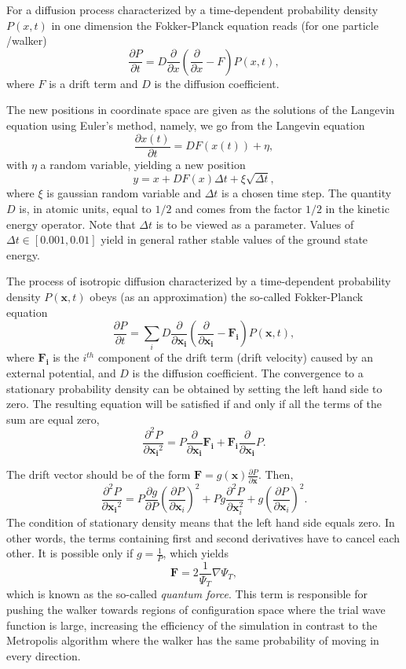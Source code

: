 For a diffusion process characterized by a time-dependent probability density $P(x,t)$ in one dimension the Fokker-Planck
equation reads (for one particle /walker) 
\[
   \frac{\partial P}{\partial t} = D\frac{\partial }{\partial x}\left(\frac{\partial }{\partial x} -F\right)P(x,t),
\]
where $F$ is a drift term and $D$ is the diffusion coefficient. 

The new positions in coordinate space are given as the solutions of the Langevin equation using Euler's method, namely,
we go from the Langevin equation
\[ 
   \frac{\partial x(t)}{\partial t} = DF(x(t)) +\eta,
\]
with $\eta$ a random variable,
yielding a new position 
\[
   y = x+DF(x)\Delta t +\xi\sqrt{\Delta t},
\]
where $\xi$ is gaussian random variable and $\Delta t$ is a chosen time step. 
The quantity $D$ is, in atomic units, equal to $1/2$ and comes from the factor $1/2$ in the kinetic energy operator. Note that $\Delta t$ is to be viewed as a parameter. Values of $\Delta t \in [0.001,0.01]$ yield in general rather stable values of the ground state energy.  

The process of isotropic diffusion characterized by a time-dependent probability density $P(\mathbf{x},t)$ obeys (as an approximation) the so-called Fokker-Planck equation 
\[
   \frac{\partial P}{\partial t} = \sum_i D\frac{\partial }{\partial \mathbf{x_i}}\left(\frac{\partial }{\partial \mathbf{x_i}} -\mathbf{F_i}\right)P(\mathbf{x},t),
\]
where $\mathbf{F_i}$ is the $i^{th}$ component of the drift term (drift velocity) caused by an external potential, and $D$ is the diffusion coefficient. The convergence to a stationary probability density can be obtained by setting the left hand side to zero. The resulting equation will be satisfied if and only if all the terms of the sum are equal zero,
\[
\frac{\partial^2 P}{\partial {\mathbf{x_i}^2}} = P\frac{\partial}{\partial {\mathbf{x_i}}}\mathbf{F_i} + \mathbf{F_i}\frac{\partial}{\partial {\mathbf{x_i}}}P.
\]

The drift vector should be of the form $\mathbf{F} = g(\mathbf{x}) \frac{\partial P}{\partial \mathbf{x}}$. Then,
\[
\frac{\partial^2 P}{\partial {\mathbf{x_i}^2}} = P\frac{\partial g}{\partial P}\left( \frac{\partial P}{\partial {\mathbf{x}_i}}  \right)^2 + P g \frac{\partial ^2 P}{\partial {\mathbf{x}_i^2}}  + g \left( \frac{\partial P}{\partial {\mathbf{x}_i}}  \right)^2.
\]
The condition of stationary density means that the left hand side equals zero. In other words, the terms containing first and second derivatives have to cancel each other. It is possible only if $g = \frac{1}{P}$, which yields
\[
\mathbf{F} = 2\frac{1}{\Psi_T}\nabla\Psi_T,
\]
which is known as the so-called \emph{quantum force}. This term is responsible for pushing the walker towards regions of configuration space where the trial wave function is large, increasing the efficiency of the simulation in contrast to the Metropolis algorithm where the walker has the same probability of moving in every direction.

